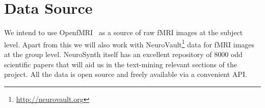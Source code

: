 \documentclass[11pt]{article}
\begin{document}
\begin{enumerate}
\end{enumerate}

\section{Data Source}
We intend to use OpenfMRI~\cite{poldrack2013toward} as a source of raw fMRI images at the subject level. Apart from this we will also work with NeuroVault\footnote{\url{http://neurovault.org}} data for fMRI images at the group level. NeuroSynth itself has an excellent repository of $8000$ odd scientific papers that will aid us in the text-mining relevant sections of the project. All the data is open source and freely available via a convenient API. 

\small

\nocite{*}

\end{document}
